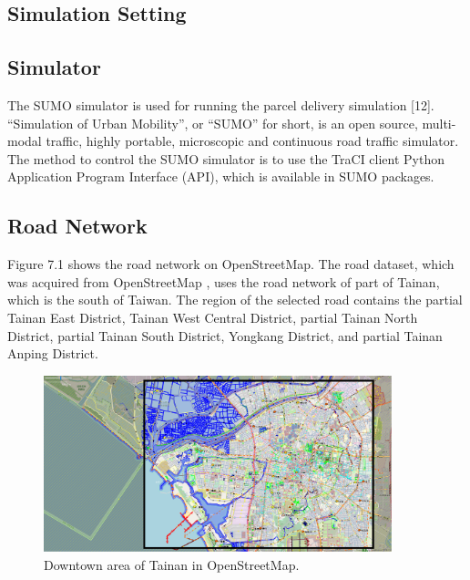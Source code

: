 \documentclass[12pt]{ksthesis}
\begin{document}
\begin{thesis}
{\section{Simulation Setting}

\subsection{Simulator}
The SUMO simulator is used for running the parcel delivery simulation [12]. “Simulation of Urban Mobility”, or “SUMO” for short, is an open source, multi-modal traffic, highly portable, microscopic and continuous road traffic simulator. The method to control the SUMO simulator is to use the TraCI client Python Application Program Interface (API), which is available in SUMO packages.

\subsection{Road Network}

Figure 7.1 shows the road network on OpenStreetMap.
The road dataset, which was acquired from OpenStreetMap \cite{Haklay2008}, uses the road network of part of Tainan, which is the south of Taiwan. The region of the selected road contains the partial Tainan East District, Tainan West Central District, partial Tainan North District, partial Tainan South District, Yongkang District, and partial Tainan Anping District.



\begin{figure}[H]
\centering
\includegraphics[width=0.9\textwidth]{./Thesis_figures/F7-1_Openstreetmap.PNG}
\caption{\large Downtown area of Tainan in OpenStreetMap.}
\vspace{0.5cm}
\label{Fig:DowntownArea_in_OpenStreetMap.}
\end{figure}

}
\end{thesis}
\end{document}
